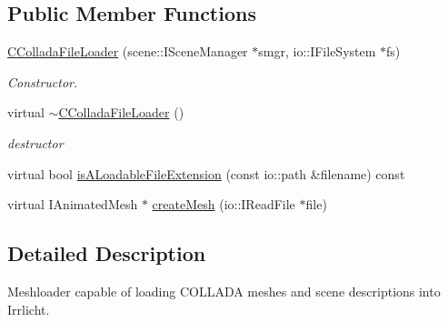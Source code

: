 \subsection*{Public Member Functions}
\begin{DoxyCompactItemize}
\item 
\hypertarget{classirr_1_1scene_1_1_c_collada_file_loader_a38b57a016ce77d29b015cdfdd9a56c34}{\hyperlink{classirr_1_1scene_1_1_c_collada_file_loader_a38b57a016ce77d29b015cdfdd9a56c34}{C\-Collada\-File\-Loader} (scene\-::\-I\-Scene\-Manager $\ast$smgr, io\-::\-I\-File\-System $\ast$fs)}\label{classirr_1_1scene_1_1_c_collada_file_loader_a38b57a016ce77d29b015cdfdd9a56c34}

\begin{DoxyCompactList}\small\item\em Constructor. \end{DoxyCompactList}\item 
\hypertarget{classirr_1_1scene_1_1_c_collada_file_loader_a8a34e298e8a89a3817a01e6e2fa1ec53}{virtual \hyperlink{classirr_1_1scene_1_1_c_collada_file_loader_a8a34e298e8a89a3817a01e6e2fa1ec53}{$\sim$\-C\-Collada\-File\-Loader} ()}\label{classirr_1_1scene_1_1_c_collada_file_loader_a8a34e298e8a89a3817a01e6e2fa1ec53}

\begin{DoxyCompactList}\small\item\em destructor \end{DoxyCompactList}\item 
virtual bool \hyperlink{classirr_1_1scene_1_1_c_collada_file_loader_a53e45168d79f779a88c8fe4d79a444c3}{is\-A\-Loadable\-File\-Extension} (const io\-::path \&filename) const 
\item 
virtual I\-Animated\-Mesh $\ast$ \hyperlink{classirr_1_1scene_1_1_c_collada_file_loader_a7be8ed6cb5625e51a1970fa3582c0040}{create\-Mesh} (io\-::\-I\-Read\-File $\ast$file)
\end{DoxyCompactItemize}


\subsection{Detailed Description}
Meshloader capable of loading C\-O\-L\-L\-A\-D\-A meshes and scene descriptions into Irrlicht. 


